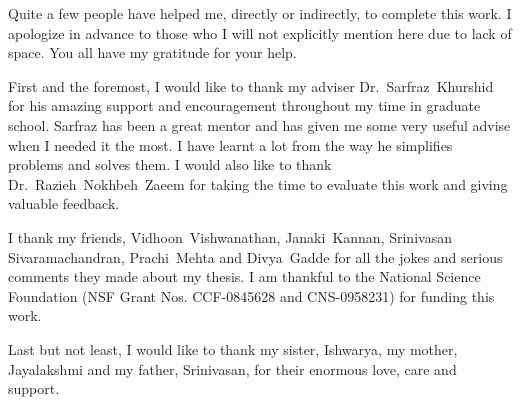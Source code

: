 \documentclass[12pt,letter]{report}
\renewcommand{\chosenspacing}{\doublespace}      %
\begin{document}
\thesiscopyrightpage                 %

\thesiscertificationpage             %

\thesistitlepage                     %


\thesisdedicationpage                %

\begin{thesisacknowledgments}        %
Quite a few people have helped me, directly or indirectly, to complete
this work. I apologize in advance to those who I will not explicitly
mention here due to lack of space. You all have my gratitude for your
help.

First and the foremost, I would like to thank my adviser
\mbox{Dr. Sarfraz Khurshid} for his amazing support and encouragement
throughout my time in graduate school. Sarfraz has been a great mentor
and has given me some very useful advise when I needed it the most. I
have learnt a lot from the way he simplifies problems and solves
them. I would also like to thank \mbox{Dr. Razieh Nokhbeh Zaeem} for
taking the time to evaluate this work and giving valuable feedback.

I thank my friends, \mbox{Vidhoon Vishwanathan}, \mbox{Janaki Kannan},
\mbox{Srinivasan} \\ \mbox{Sivaramachandran}, \mbox{Prachi Mehta} and
\mbox{Divya Gadde} for all the jokes and serious comments they made
about my thesis. I am thankful to the National Science Foundation (NSF
Grant Nos. CCF-0845628 and CNS-0958231) for funding this work.

Last but not least, I would like to thank my sister, \mbox{Ishwarya},
my mother, \mbox{Jayalakshmi} and my father, \mbox{Srinivasan}, for
their enormous love, care and support.
\end{thesisacknowledgments}          %


\begin{thesisabstract}               %
\chosenspacing
\indent
\end{thesisabstract}

\tableofcontents                     %
\clearpage
\listoftables                      %
\clearpage
\listoffigures                     %
\clearpage
\end{document}
